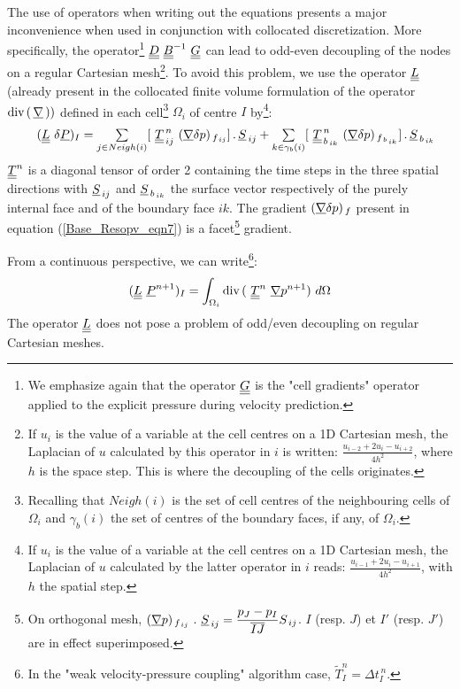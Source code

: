 The use of operators when writing out the equations presents a major inconvenience when used in conjunction with collocated discretization. More specifically, the operator\footnote{We emphasize again that the operator $\underline{\underline{G}}$ is the "cell gradients" operator applied to the explicit pressure during velocity prediction.}
$\underline{\underline{D}}\ \underline{\underline{B}}^{-1}\ \underline{\underline{G}}$ can lead to odd-even decoupling of the nodes on a regular Cartesian
mesh\footnote{If $u_i$ is the value of a variable at the cell centres on a 1D Cartesian mesh, the Laplacian
of $u$ calculated by this operator in $i$ is written: $\displaystyle
\frac{u_{i-2}+2u_i-u_{i+2}}{4h^2}$, where $\displaystyle h$ is the space step.  This is where the decoupling of the cells originates.}.
To avoid this problem, we use the operator $\underline{\underline{L}}$ (already present in the collocated finite volume
formulation of the operator $\text{div}\,(\,\underline{\nabla}\,))$ defined in each cell\footnote{Recalling that $Neigh(i)$ is the set of cell centres of the neighbouring cells of ${\Omega_i}$ and
$\gamma_b(i)$ the set of centres of the boundary faces, if any, of ${\Omega_i}$.} $\Omega_i$ of centre $I$ by\footnote{If $u_i$ is the value of a variable at the cell centres on a 1D Cartesian mesh, the Laplacian
of $u$ calculated by the latter operator in $i$ reads: $\displaystyle \frac{u_{i-1}+2u_i-u_{i+1}}{4h^2}$, with $\displaystyle h$ the spatial step.}:
\begin{equation}\label{Base_Resopv_eqn7}
\begin{array}{ll}
&(\tens{L}\ \delta \vect{P})_I = \sum\limits_{j\in Neigh(i)}[\ \tens{T}^{\,n}_{\,ij}\ (\grad{\delta p})_{\,f_{\,ij}}]\,.\,\vect{S}_{\,ij}
+ \sum\limits_{k\in {\gamma_b(i)}}[\ \tens{T}^{\,n}_{\,b_{\,ik}}\ (\grad{\delta p})_{\,f_{\,b_{\,ik}}}]\,.\,\vect{S}_{\,b_{\,ik}}
\end{array}
\end{equation}
$\underline{\underline{T}}^n$ is a diagonal tensor of order 2 containing the time steps in the three spatial directions with $\underline{S}_{\,ij}$ and $\underline{S}_{\,b_{\,ik}}$ the surface vector respectively of the purely internal face and of the boundary face $ik$. The gradient $(\underline{\nabla}{ \delta p})_{\,f_{  }}$  present in equation (\ref{Base_Resopv_eqn7}) is a facet\footnote{On orthogonal mesh, $\displaystyle (\grad{p})_{\,f_{\,ij}} \ . \ \vect{S}_{\,ij} = \frac{ p_J - p_I }{\overline{IJ}} S_{\,ij}$. $I$ (resp. $J$) et $I'$ (resp. $J'$) are in effect superimposed.} gradient.

From a continuous perspective, we can write\footnote{In the "weak velocity-pressure coupling" algorithm case, $\widetilde{T}^n_I = \Delta t^{\,n}_I$.}:
$$(\tens{L}\ \vect{P}^{n+1})_I = \int_{\Omega_i}\dive{(\ {\tens{T}}^n \ \grad{p^{n+1}})} \ d\Omega $$
The operator $\underline{\underline{L}}$ does not pose a problem of odd/even decoupling on regular Cartesian meshes.

